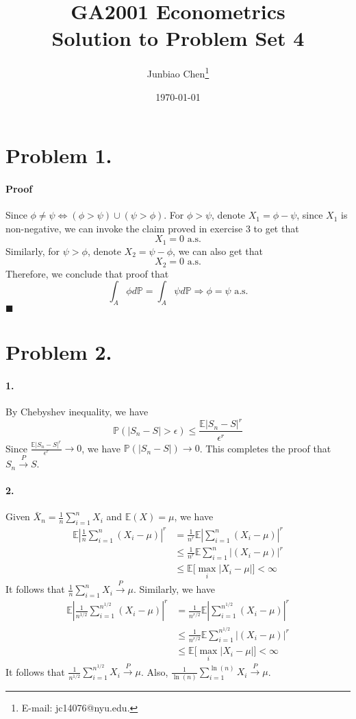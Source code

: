 \documentclass[11pt]{article}
\title{GA2001 Econometrics \\Solution to Problem Set 4}
\author{
Junbiao Chen\thanks{E-mail: jc14076@nyu.edu.}
}
\date{\today}
\theoremstyle{definition}
\theoremstyle{boldtitle} %
\numberwithin{equation}{section}
\numberwithin{figure}{section}
\numberwithin{table}{section}
\begin{document}
\maketitle
\section*{Problem 1.}
\paragraph{Proof} 
Since $\phi \neq \psi \Leftrightarrow (\phi > \psi) \cup (\psi > \phi)$. 
For $\phi > \psi$, denote $X_1 = \phi - \psi$, since $X_1$ is non-negative, we can invoke the 
claim proved in exercise 3 to get that 
\[
X_1 = 0 \text{ a.s.}
\]
Similarly, for $\psi > \phi$, denote $X_2 = \psi - \phi$, we can also get that
\[
X_2 = 0 \text{ a.s.}
\]
Therefore, we conclude that proof that 
\[
\int_A \phi d \mathbb{P} = \int_A \psi d \mathbb{P} \Rightarrow \phi = \psi \text{ a.s.}
\]
\(\blacksquare\)

\section*{Problem 2.}
\paragraph{1.} By Chebyshev inequality, we have 
\[
\mathbb{P}(|S_n - S| > \epsilon) \leq \frac{\mathbb{E}|S_n - S|^r}{\epsilon^r}
\]
Since $\frac{\mathbb{E}|S_n - S|^r}{\epsilon^r} \rightarrow 0$, we have $\mathbb{P}(|S_n - S|) \rightarrow 0$.
This completes the proof that $S_n \xrightarrow{P} S$.

\paragraph{2.} 
Given $\bar{X}_n = \frac{1}{n} \sum_{i=1}^n X_i$ and $\mathbb{E}(X) = \mu$, we have 
\begin{align*}
\mathbb{E}|\frac{1}{n} \sum_{i=1}^n (X_i - \mu)|^r & = \frac{1}{n^r} \mathbb{E}|\sum_{i=1}^n (X_i - \mu)|^r \\ 
& \leq \frac{1}{n^r} \mathbb{E}\sum_{i=1}^n |(X_i - \mu)|^r \\ 
& \leq \mathbb{E} \bigg[\max_i |X_i - \mu| \bigg] < \infty
\end{align*}
It follows that $ \frac{1}{n} \sum_{i=1}^n X_i \xrightarrow{P} \mu$.
Similarly, we have 
\begin{align*}
\mathbb{E}|\frac{1}{n^{1/2}} \sum_{i=1}^{n^{1/2}} (X_i - \mu)|^r & = \frac{1}{n^{r/2}} \mathbb{E}|\sum_{i=1}^{n^{1/2}} (X_i - \mu)|^r \\ 
& \leq \frac{1}{n^{r/2}} \mathbb{E}\sum_{i=1}^{n^{1/2}} |(X_i - \mu)|^r \\ 
& \leq \mathbb{E} \bigg[\max_i |X_i - \mu| \bigg] < \infty
\end{align*}
It follows that $\frac{1}{n^{1/2}} \sum_{i=1}^{n^{1/2}} X_i \xrightarrow{P} \mu$.
Also, $\frac{1}{\ln (n)} \sum_{i=1}^{\ln (n)} X_i \xrightarrow{P} \mu$.
\end{document}
